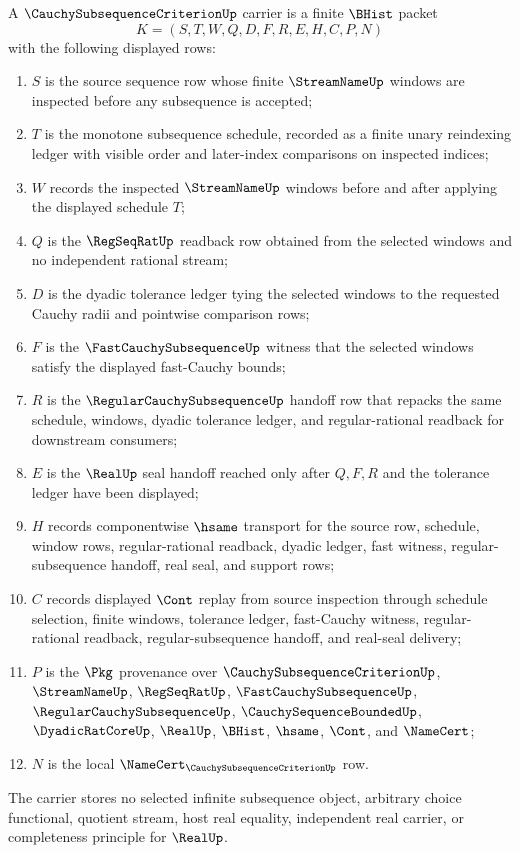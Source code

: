 \begin{definition}
\label{def:cauchy-subsequence-criterion-carrier}
A $\CauchySubsequenceCriterionUp$ carrier is a finite $\BHist$ packet
$$
K=(S,T,W,Q,D,F,R,E,H,C,P,N)
$$
with the following displayed rows:
\begin{enumerate}
\item $S$ is the source sequence row whose finite $\StreamNameUp$ windows are inspected before any subsequence is accepted;
\item $T$ is the monotone subsequence schedule, recorded as a finite unary reindexing ledger with visible order and later-index comparisons on inspected indices;
\item $W$ records the inspected $\StreamNameUp$ windows before and after applying the displayed schedule $T$;
\item $Q$ is the $\RegSeqRatUp$ readback row obtained from the selected windows and no independent rational stream;
\item $D$ is the dyadic tolerance ledger tying the selected windows to the requested Cauchy radii and pointwise comparison rows;
\item $F$ is the $\FastCauchySubsequenceUp$ witness that the selected windows satisfy the displayed fast-Cauchy bounds;
\item $R$ is the $\RegularCauchySubsequenceUp$ handoff row that repacks the same schedule, windows, dyadic tolerance ledger, and regular-rational readback for downstream consumers;
\item $E$ is the $\RealUp$ seal handoff reached only after $Q,F,R$ and the tolerance ledger have been displayed;
\item $H$ records componentwise $\hsame$ transport for the source row, schedule, window rows, regular-rational readback, dyadic ledger, fast witness, regular-subsequence handoff, real seal, and support rows;
\item $C$ records displayed $\Cont$ replay from source inspection through schedule selection, finite windows, tolerance ledger, fast-Cauchy witness, regular-rational readback, regular-subsequence handoff, and real-seal delivery;
\item $P$ is the $\Pkg$ provenance over $\CauchySubsequenceCriterionUp$, $\StreamNameUp$, $\RegSeqRatUp$, $\FastCauchySubsequenceUp$, $\RegularCauchySubsequenceUp$, $\CauchySequenceBoundedUp$, $\DyadicRatCoreUp$, $\RealUp$, $\BHist$, $\hsame$, $\Cont$, and $\NameCert$;
\item $N$ is the local $\NameCert_{\CauchySubsequenceCriterionUp}$ row.
\end{enumerate}
The carrier stores no selected infinite subsequence object, arbitrary choice functional, quotient stream, host real equality, independent real carrier, or completeness principle for $\RealUp$.
\end{definition}

